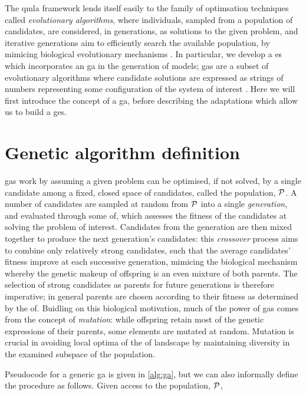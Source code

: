 The \gls{qmla} framework lends itself easily to the family of optimsation techniques called \emph{evolutionary algorithms}, 
    where individuals, sampled from a population of candidates, are considered, in generations, as solutions to the given problem,
    and iterative generations aim to efficiently search the available population, 
    by mimicing biological evolutionary mechanisms \cite{back1996evolutionary}. 
In particular, we develop a \gls{es} which incorporates an \gls{ga} in the generation of models;
    \glspl{ga} are a subset of evolutionary algorithms where candidate solutions are expressed as 
    strings of numbers representing some configuration of the system of interest \cite{holland1992adaptation}.
Here we will first introduce the concept of a \gls{ga}, before describing the adaptations which allow us to 
    build a \gls{ges}. 

\section{Genetic algorithm definition}
\glspl{ga} work by assuming a given problem can be optimised, if not solved, by a single candidate 
    among a fixed, closed space of candidates, called the population, $\mathcal{P}$. 
A number of candidates are sampled at random from $\mathcal{P}$ into a single \emph{generation}, 
    and evaluated through some \gls{of}, which assesses the fitness of the candidates at solving the problem of interest. 
Candidates from the generation are then mixed together to produce the next generation's candidates: 
    this \emph{crossover} process aims to combine only relatively strong candidates, such that the average 
    candidates' fitness improve at each successive generation, 
    mimicing the biological mechanism whereby the genetic makeup of offspring is an even mixture of both parents. 
The selection of strong candidates as parents for future generations is therefore imperative; 
    in general parents are chosen according to their fitness as determined by the \gls{of}. 
Buidling on this biological motivation, much of the power of \glspl{ga} comes from the concept of \emph{mutation}: 
    while offspring retain most of the genetic expressions of their parents, some elements are mutated at random.
Mutation is crucial in avoiding local optima of the \gls{of} landscape
    by maintaining diversity in the examined subspace of the population.
\par 

Pseudocode for a generic \gls{ga} is given in \cref{alg:ga},
    but we can also informally define the procedure as follows. 
Given access to the population, $\mathcal{P}$, 


